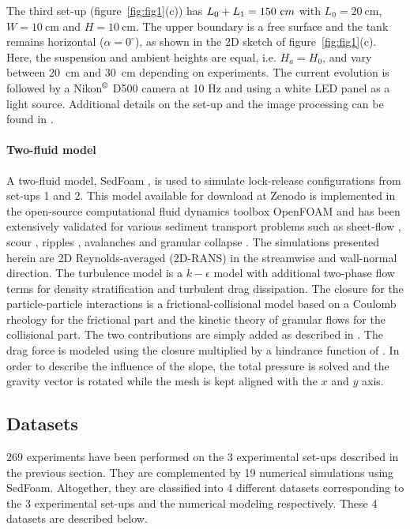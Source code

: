 \documentclass[12pt]{article}
\begin{document}
The third set-up (figure~\ref{fig:fig1}(c)) has $L_0+L_1=150~{\text cm}$ with $L_0 = 20~\textrm{cm}$, $W= 10~\textrm{cm}$ and $H = 10~\textrm{cm}$. The upper boundary is a free surface and the tank remains horizontal ($\alpha = 0^\circ$), as shown in the 2D sketch of figure~\ref{fig:fig1}(c). Here, the suspension and ambient heights are equal, i.e. $H_{a}=H_{0}$, and vary between 20~cm and 30~cm depending on experiments. The current evolution is followed by a Nikon$^\copyright$ D500 camera at 10 Hz and using a white LED panel as a light source. Additional details on the set-up and the image processing can be found in \citet{Schneider2023}.


\paragraph{Two-fluid model}

A two-fluid model, SedFoam \citep{chauchat2017}, is used to simulate lock-release configurations from set-ups 1 and 2. This model available for download at Zenodo \citep{bonamy2023} is implemented in the open-source computational fluid dynamics toolbox OpenFOAM and has been extensively validated for various sediment transport problems such as sheet-flow \citep{cheng2016,chauchat2022,mathieu2021,mathieu2022}, scour \citep{nagel2020,tsai2022}, ripples \citep{salimi2021a,salimi2021b}, avalanches \citep{montella2021} and granular collapse \citep{montella2023}. The simulations presented herein are 2D Reynolds-averaged (2D-RANS) in the streamwise and wall-normal direction. The turbulence model is a $k-\epsilon$ model with additional two-phase flow terms for density stratification and turbulent drag dissipation. The closure for the particle-particle interactions is a frictional-collisional model based on a Coulomb rheology for the frictional part and the kinetic theory of granular flows for the collisional part. The two contributions are simply added as described in \cite{chauchat2017}. The drag force is modeled using the \cite{schiller1933} closure multiplied by a hindrance function of \cite{richardson1954}. In order to describe the influence of the slope, the total pressure is solved and the gravity vector is rotated while the mesh is kept aligned with the $x$ and $y$ axis.

\subsection{Datasets}
\label{sec:datasets}

269 experiments have been performed on the 3 experimental set-ups described in the previous section. They are complemented by 19 numerical simulations using SedFoam. Altogether, they are classified into 4 different datasets corresponding to the 3 experimental set-ups and the numerical modeling respectively. These 4 datasets are described below.
\end{document}
